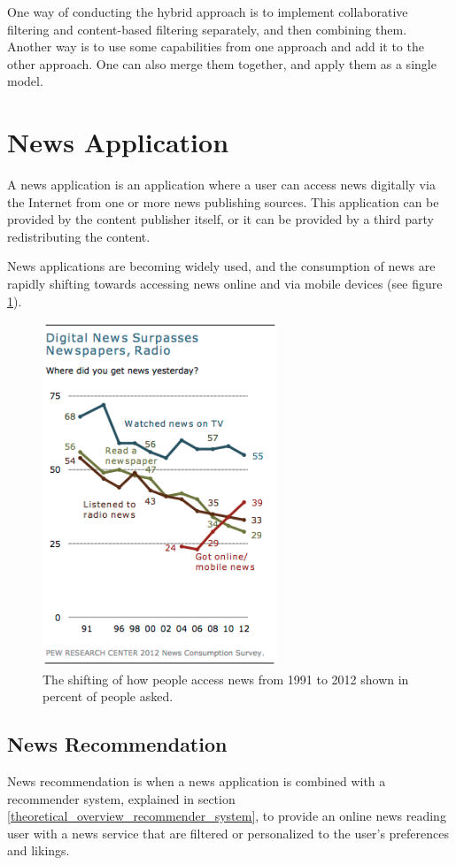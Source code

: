 One way of conducting the hybrid approach is to implement collaborative filtering and content-based filtering separately, and then combining them. Another way is to use some capabilities from one approach and add it to the other approach. One can also merge them together, and apply them as a single model.

\section{News Application}
A news application is an application where a user can access news digitally via the Internet from one or more news publishing sources. This application can be provided by the content publisher itself, or it can be provided by a third party redistributing the content.

News applications are becoming widely used, and the consumption of news are rapidly shifting towards accessing news online and via mobile devices (see figure \ref{pew_news_consumption_survey}).

\begin{figure}[!htbp]
\centering
\includegraphics[width=70mm]{GFX/tech/pewNewsConsumptionSurvey.png}
\caption{The shifting of how people access news from 1991 to 2012 shown in percent of people asked.}
\label{pew_news_consumption_survey}
\end{figure}

\subsection{News Recommendation}
News recommendation is when a news application is combined with a recommender system, explained in section \ref{theoretical_overview_recommender_system}, to provide an online news reading user with a news service that are filtered or personalized to the user's preferences and likings.

